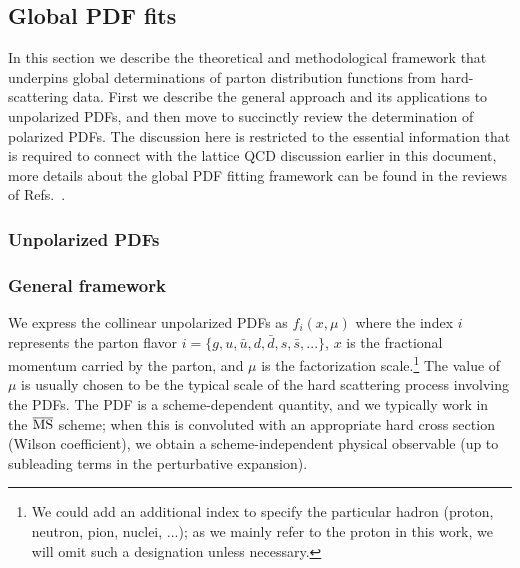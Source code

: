 \subsection{Global PDF fits}

In this section we describe the theoretical and methodological framework that underpins global
determinations of parton distribution functions from hard-scattering data.
%
First we describe the general approach and its applications to unpolarized PDFs, and then
move to succinctly review the determination of polarized PDFs.
%
The discussion here is restricted to the essential information that is required to connect
with the lattice QCD discussion earlier in this document, more details about the
global PDF fitting framework can be found in the reviews of
Refs.~\cite{Ball:2012wy,Forte:2013wc,Rojo:2015acz,Butterworth:2015oua}.


\subsubsection{Unpolarized PDFs}

\subsubsection*{General framework}

We express the collinear unpolarized PDFs as $f_{i}(x,\mu)$
where the index $i$ represents the parton flavor $i=\{g,u,\bar{u},d,\bar{d},s,\bar{s},...\}$,
$x$ is the fractional momentum carried by the parton, and $\mu$
is the factorization  scale.\footnote{We could add an additional index to specify the particular hadron
(proton, neutron, pion, nuclei, ...); as we mainly refer to the proton
  in this work, we will omit such a designation unless necessary.}
%
The value of $\mu$ is usually chosen to be the typical scale of the hard scattering
process involving the PDFs.
%
The PDF is a scheme-dependent quantity, and we typically work in
the $\overline{\rm MS}$ scheme; when this is convoluted with an appropriate
hard cross section (Wilson coefficient), we obtain a scheme-independent
physical observable (up to subleading terms in the perturbative expansion). 


